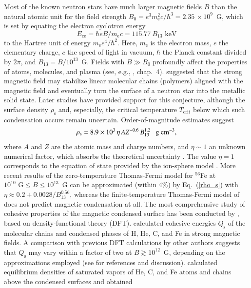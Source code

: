 \documentclass{aa}
\newcommand{\beq}{\begin{equation}}
\newcommand{\eeq}{\end{equation}}
\newcommand{\req}[1]{Eq.~(\ref{#1})}
\newcommand{\Ece}{E_\mathrm{ce}}
\newcommand{\gcc}{\mbox{g cm$^{-3}$}}
\newcommand{\mel}{m_\mathrm{e}} %
\begin{document}
Most of the known neutron stars have much larger magnetic fields $B$
than the natural atomic unit
for the field strength $B_0=e^3 \mel^2 c/\hbar^3 = 
2.35\,\times 10^9$~G, which is set by equating the electron cyclotron
energy
\beq
   \Ece = \hbar eB/\mel c =115.77~B_{13}\textrm{ keV}
\label{omce}
\eeq
to the Hartree unit of energy $\mel e^4/\hbar^2$.
Here, $\mel$ is the electron mass, $e$ the elementary
charge, $c$ the speed of light in vacuum, 
$\hbar$ the Planck constant divided by $2\pi$,
and $B_{13}=B/10^{13}$~G. 
Fields with $B \gg B_0$ profoundly affect the properties
of atoms, molecules, and plasma (see, e.g., \citealp{NSB1},
chap.~4). 
\citet{Ruderman71} suggested that the strong magnetic field
may 
stabilize linear molecular chains (polymers) aligned with the
magnetic field and eventually
turn the surface of a neutron star into the metallic
solid state.
Later studies have provided support for this conjecture,
although 
the surface density $\rho_\mathrm{s}$ and, especially,
the critical temperature $T_\mathrm{crit}$
below which such condensation
occurs remain uncertain.
Order-of-magnitude estimates suggest
\beq
   \rho_\mathrm{s} = 
   8.9\times10^3\,\eta\,AZ^{-0.6}\,B_{13}^{1.2}
   \textrm{~~~\gcc},
\label{rho_s}
\eeq
where $A$ and $Z$ are the atomic mass and charge numbers,
and $\eta\sim1$ an unknown numerical factor, which
absorbs the theoretical uncertainty \citep[see][]{Lai01}. The
value $\eta=1$ corresponds to the equation of state
provided by the ion-sphere model \citep{Salpeter54}.
More recent results of the zero-temperature Thomas-Fermi
model for $^{56}$Fe at
$10^{10}\mbox{~G}\leqslant B\leqslant 10^{13}$~G
\citep{Fushiki-ea,Rognvaldsson-ea} can be  approximated 
(within 4\%) by \req{rho_s} with
$\eta\approx0.2+0.0028/B_{13}^{0.56}$, whereas the
finite-temperature Thomas-Fermi model of
\citet{Thorolfsson-ea} does not predict magnetic
condensation at all. The most comprehensive study of
cohesive properties of the magnetic condensed surface has
been conducted by \citet{MedinLai06,MedinLai07}, based on
density-functional theory (DFT).
\citet{MedinLai06} calculated cohesive energies
$Q_\mathrm{s}$ of the molecular chains and condensed
phases of H, He, C, and Fe in strong magnetic fields. A
comparison with previous DFT calculations by
other authors suggests that $Q_\mathrm{s}$ may vary within a
factor of two at $B\gtrsim10^{12}$~G, depending on the
approximations employed (see \citealp{MedinLai06} for references and
discussion). \citet{MedinLai07} calculated equilibrium
densities of saturated vapors of He, C, and Fe atoms and
chains above the condensed surfaces and  obtained
\end{document}
